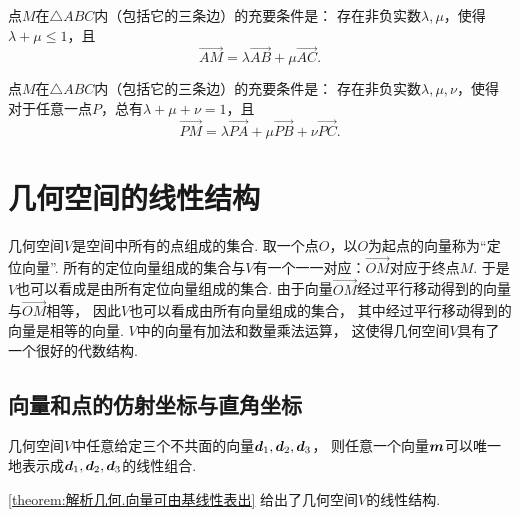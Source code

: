\begin{theorem}
点\(M\)在\(\triangle ABC\)内（包括它的三条边）的充要条件是：
存在非负实数\(\lambda,\mu\)，使得\(\lambda+\mu\leqslant1\)，且\[
\vec{AM} = \lambda \vec{AB} + \mu \vec{AC}.
\]
\end{theorem}

\begin{theorem}
点\(M\)在\(\triangle ABC\)内（包括它的三条边）的充要条件是：
存在非负实数\(\lambda,\mu,\nu\)，使得对于任意一点\(P\)，总有\(\lambda+\mu+\nu=1\)，且\[
\vec{PM} = \lambda \vec{PA} + \mu \vec{PB} + \nu \vec{PC}.
\]
\end{theorem}

\section{几何空间的线性结构}
几何空间\(V\)是空间中所有的点组成的集合.
取一个点\(O\)，以\(O\)为起点的向量称为“定位向量”.
所有的定位向量组成的集合与\(V\)有一个一一对应：\(\vec{OM}\)对应于终点\(M\).
于是\(V\)也可以看成是由所有定位向量组成的集合.
由于向量\(\vec{OM}\)经过平行移动得到的向量与\(\vec{OM}\)相等，
因此\(V\)也可以看成由所有向量组成的集合，
其中经过平行移动得到的向量是相等的向量.
\(V\)中的向量有加法和数量乘法运算，
这使得几何空间\(V\)具有了一个很好的代数结构.

\subsection{向量和点的仿射坐标与直角坐标}
\begin{theorem}\label{theorem:解析几何.向量可由基线性表出}
几何空间\(V\)中任意给定三个不共面的向量\(\boldsymbol{d}_1,\boldsymbol{d}_2,\boldsymbol{d}_3\)，
则任意一个向量\(\boldsymbol{m}\)可以唯一地表示成\(\boldsymbol{d}_1,\boldsymbol{d}_2,\boldsymbol{d}_3\)的线性组合.
\end{theorem}
\cref{theorem:解析几何.向量可由基线性表出} 给出了几何空间\(V\)的线性结构.

\begin{figure}[ht]
	\centering
	\caption{}
	\label{figure:解析几何.向量的坐标分解}
\end{figure}

